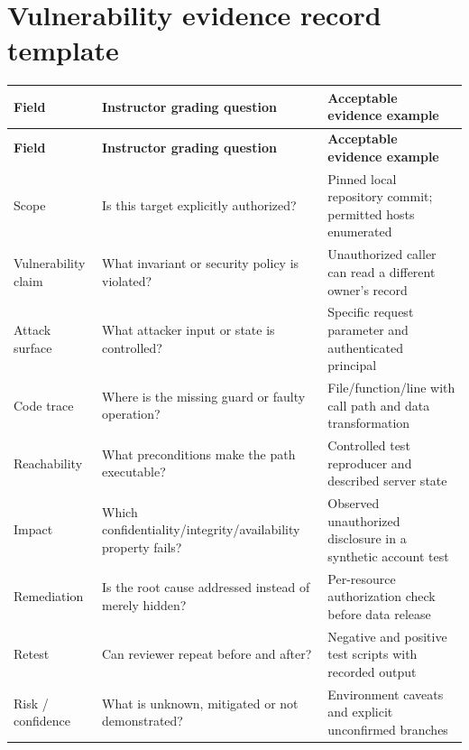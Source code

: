 \documentclass[10pt,letterpaper]{article}
\begin{document}
\section{Vulnerability evidence record template}
\begingroup\footnotesize\setlength\tabcolsep{3pt}
\begin{longtable}{>{\raggedright\arraybackslash}p{}>{\raggedright\arraybackslash}p{}>{\raggedright\arraybackslash}p{}}\toprule
\textbf{Field} & \textbf{Instructor grading question} & \textbf{Acceptable evidence example}\\\midrule\endfirsthead
\toprule \textbf{Field} & \textbf{Instructor grading question} & \textbf{Acceptable evidence example}\\\midrule\endhead
Scope & Is this target explicitly authorized? & Pinned local repository commit; permitted hosts enumerated\\\midrule
Vulnerability claim & What invariant or security policy is violated? & Unauthorized caller can read a different owner's record\\\midrule
Attack surface & What attacker input or state is controlled? & Specific request parameter and authenticated principal\\\midrule
Code trace & Where is the missing guard or faulty operation? & File/function/line with call path and data transformation\\\midrule
Reachability & What preconditions make the path executable? & Controlled test reproducer and described server state\\\midrule
Impact & Which confidentiality/integrity/availability property fails? & Observed unauthorized disclosure in a synthetic account test\\\midrule
Remediation & Is the root cause addressed instead of merely hidden? & Per-resource authorization check before data release\\\midrule
Retest & Can reviewer repeat before and after? & Negative and positive test scripts with recorded output\\\midrule
Risk / confidence & What is unknown, mitigated or not demonstrated? & Environment caveats and explicit unconfirmed branches\\\midrule
\bottomrule\end{longtable}\endgroup
\end{document}
